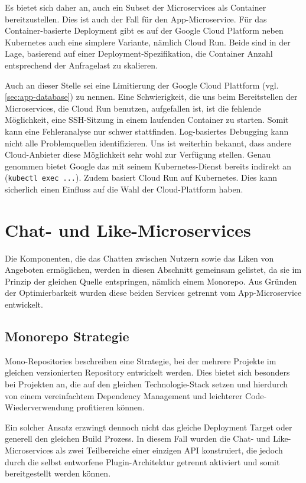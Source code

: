 \documentclass{article}
\begin{document}
Es bietet sich daher an, auch ein Subset der Microservices als Container bereitzustellen. Dies ist auch der Fall für den App-Microservice.  Für das Container-basierte Deployment gibt es auf der Google Cloud Platform neben Kubernetes auch eine simplere Variante, nämlich Cloud Run. Beide sind in der Lage, basierend auf einer Deployment-Spezifikation, die Container Anzahl entsprechend der Anfragelast zu skalieren.

Auch an dieser Stelle sei eine Limitierung der Google Cloud Plattform (vgl. \autoref{sec:app-database}) zu nennen. Eine Schwierigkeit, die uns beim Bereitstellen der Microservices, die Cloud Run benutzen, aufgefallen ist, ist die fehlende Möglichkeit, eine SSH-Sitzung in einem laufenden Container zu starten. Somit kann eine Fehleranalyse nur schwer stattfinden. Log-basiertes Debugging kann nicht alle Problemquellen identifizieren. Uns ist weiterhin bekannt, dass andere Cloud-Anbieter diese Möglichkeit sehr wohl zur Verfügung stellen. Genau genommen bietet Google das mit seinem Kubernetes-Dienst bereits indirekt an (\texttt{kubectl exec ...}). Zudem basiert Cloud Run auf Kubernetes. Dies kann sicherlich einen Einfluss auf die Wahl der Cloud-Plattform haben.


\section{Chat- und Like-Microservices} %

Die Komponenten, die das Chatten zwischen Nutzern sowie das Liken von Angeboten ermöglichen, werden in diesen Abschnitt gemeinsam gelistet, da sie im Prinzip der gleichen Quelle entspringen, nämlich einem Monorepo. 
Aus Gründen der Optimierbarkeit wurden diese beiden Services getrennt vom App-Microservice entwickelt. 
\subsection{Monorepo Strategie}

Mono-Repositories beschreiben eine Strategie, bei der mehrere Projekte im gleichen versionierten Repository entwickelt werden. Dies bietet sich besonders bei Projekten an, die auf den gleichen Technologie-Stack setzen und hierdurch von einem vereinfachtem Dependency Management und leichterer Code-Wiederverwendung profitieren können.

Ein solcher Ansatz erzwingt dennoch nicht das gleiche Deployment Target oder generell den gleichen Build Prozess. In diesem Fall wurden die Chat- und Like-Microservices als zwei Teilbereiche einer einzigen API konstruiert, die jedoch durch die selbst entworfene Plugin-Architektur getrennt aktiviert und somit bereitgestellt werden können.
\end{document}
